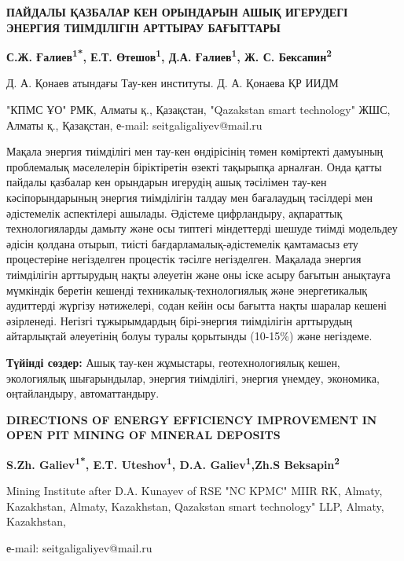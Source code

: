 \begin{center}
{\large\bfseries ПАЙДАЛЫ ҚАЗБАЛАР КЕН ОРЫНДАРЫН АШЫҚ ИГЕРУДЕГІ ЭНЕРГИЯ
ТИІМДІЛІГІН АРТТЫРАУ БАҒЫТТАРЫ}

{\bfseries С.Ж. Ғалиев\textsuperscript{1*}, Е.Т. Өтешов\textsuperscript{1},
Д.А. Ғалиев\textsuperscript{1}, Ж. С. Бексапин\textsuperscript{2}}

Д. А. Қонаев атындағы Тау-кен институты. Д. А. Қонаева ҚР ИИДМ

"КПМС ҰО" РМК, Алматы қ., Қазақстан, "Qazakstan smart technology" ЖШС,
Алматы қ., Қазақстан,
е-mail: seitgaligaliyev@mail.ru
\end{center}

Мақала энергия тиімділігі мен тау-кен өндірісінің төмен көміртекті
дамуының проблемалық мәселелерін біріктіретін өзекті тақырыпқа арналған.
Онда қатты пайдалы қазбалар кен орындарын игерудің ашық тәсілімен
тау-кен кәсіпорындарының энергия тиімділігін талдау мен бағалаудың
тәсілдері мен әдістемелік аспектілері ашылады. Әдістеме цифрландыру,
ақпараттық технологияларды дамыту және осы типтегі міндеттерді шешуде
тиімді модельдеу әдісін қолдана отырып, тиісті бағдарламалық-әдістемелік
қамтамасыз ету процестеріне негізделген процестік тәсілге негізделген.
Мақалада энергия тиімділігін арттырудың нақты әлеуетін және оны іске
асыру бағытын анықтауға мүмкіндік беретін кешенді
техникалық-технологиялық және энергетикалық аудиттерді жүргізу
нәтижелері, содан кейін осы бағытта нақты шаралар кешені әзірленеді.
Негізгі тұжырымдардың бірі-энергия тиімділігін арттырудың айтарлықтай
әлеуетінің болуы туралы қорытынды (10-15\%) және негіздеме.

{\bfseries Түйінді сөздер:} Ашық тау-кен жұмыстары, геотехнологиялық кешен,
экологиялық шығарындылар, энергия тиімділігі, энергия үнемдеу,
экономика, оңтайландыру, автоматтандыру.

\begin{center}
{\large\bfseries DIRECTIONS OF ENERGY EFFICIENCY IMPROVEMENT IN OPEN PIT MINING
OF MINERAL DEPOSITS}

{\bfseries S.Zh. Galiev\textsuperscript{1*}, E.T.
Uteshov\textsuperscript{1}, D.A. Galiev\textsuperscript{1},Zh.S
Beksapin\textsuperscript{2}}

Mining Institute after D.A. Kunayev of RSE "NC KPMC" MIIR RK, Almaty,
Kazakhstan, Almaty, Kazakhstan, Qazakstan smart technology" LLP, Almaty,
Kazakhstan,

е-mail: seitgaligaliyev@mail.ru
\end{center}

